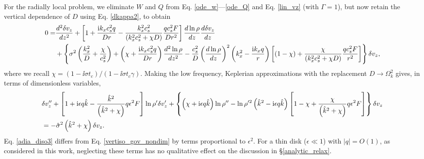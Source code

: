 For the radially local problem, we eliminate $W$ and $Q$ from Eq. \ref{ode_w}---\ref{ode_Q} and
Eq. \ref{lin_vz}  (with $\Gamma=1$), but now retain the vertical dependence
of $D$ using Eq. \ref{dkappa2}, to obtain  
\begin{align}
  0 =& \frac{d^2\delta v_z}{dz^2} + \left[1 + \frac{\mathrm{i} k_x c_s^2
      q}{Dr} - \frac{k_x^2c_s^2}{\left(k_x^2c_s^2 + \chi
        D\right)}\frac{qc_s^2F}{Dr^2}\right]\frac{d\ln\rho}{dz}\frac{d\delta
    v_z}{dz} \notag\\
  &+ \left\{\sigma^2\left(\frac{k_x^2}{D} +
      \frac{\chi}{c_s^2}\right) + \left(\chi + \frac{\mathrm{i} k_x c_s^2
        q}{Dr}\right)\frac{d^2\ln\rho}{dz^2} -
    \frac{c_s^2}{D}\left(\frac{d\ln\rho}{dz}\right)^2\left(k_x^2 -
      \frac{\mathrm{i} k_x q}{r}\right)
   \left[\left(1-\chi\right) +
     \frac{\chi}{\left(k_x^2c_s^2 + \chi D\right)}\frac{qc_s^2 F}{r^2}\right] 
   \right\}\delta v_z,
\end{align}
where we recall $\chi = \left(1-\ii\sigma t_c\right)/\left(1-\ii\sigma
t_c \gamma\right)$. Making the low frequency, Keplerian
approximations with the replacement $D\to \Omega_k^2$ gives, in terms
of dimensionless variables,
\begin{align}
   &\delta v_z ^{\prime\prime} + \left[1 + \mathrm{i}\epsilon q\hat{k} -
    \frac{ \hat{k}^2}{
      \left(\hat{k}^2+\chi\right)}q \epsilon^2F\right]\ln\rho^{\prime}\delta v_z^\prime +
  \left\{\left(\chi + \mathrm{i} \epsilon q
      \hat{k}\right)\ln\rho^{\prime\prime} - \ln\rho^{\prime
      2}\left(\hat{k}^2 -
      \mathrm{i}\epsilon
      q\hat{k}\right)\left[1 - \chi +
      \frac{\chi}{\left(\hat{k}^2+\chi\right)}q\epsilon^2F\right]\right\}\delta v_z \notag\\&=
  -\hat{\sigma}^2\left(\hat{k}^2+\chi\right)\delta v_z\label{adia_diso3}.
\end{align}   
Eq. \ref{adia_diso3} differs from Eq. \ref{vertiso_gov_nondim} by terms
proportional to $\epsilon^2$. For a thin disk ($\epsilon\ll1$) with
$|q|=O(1)$, as considered in this work, neglecting these terms has no
qualitative effect on the discussion in \S\ref{analytic_relax}. 

